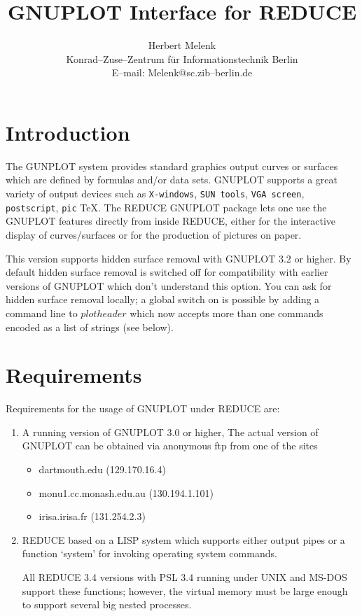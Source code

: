 \date{}
\title{GNUPLOT Interface for REDUCE}
\author{Herbert Melenk \\ 
Konrad--Zuse--Zentrum f\"ur Informationstechnik Berlin \\
E--mail: Melenk@sc.zib--berlin.de}

\maketitle

 
\section{Introduction}
The GUNPLOT system provides standard graphics output 
curves or surfaces which are defined by  
formulas and/or data sets. GNUPLOT supports a great variety of output devices
such as \verb+X-windows+, \verb+SUN tools+, 
\verb+VGA screen+, \verb+postscript+, \verb+pic+ \TeX.
The {\small REDUCE} GNUPLOT package lets one use the GNUPLOT
features directly from inside {\small REDUCE}, either for
the interactive display of curves/surfaces or for the production
of pictures on paper. 

This version supports hidden surface removal with GNUPLOT 3.2 or higher.
By default hidden surface removal is switched off for compatibility with
earlier versions of GNUPLOT which don't understand this option.
You can ask for hidden surface removal locally; a global switch on is
possible by adding a command line to $plotheader$ which now accepts
more than one commands encoded as a list of strings (see below).

 
\section{Requirements}
Requirements for the usage of GNUPLOT under REDUCE are:
\begin{enumerate}
\item A running version of GNUPLOT 3.0 or higher,
The actual version of GNUPLOT can be obtained via anonymous ftp
from one of the sites
\begin{itemize}
\item dartmouth.edu (129.170.16.4)
\item monu1.cc.monash.edu.au (130.194.1.101)
\item irisa.irisa.fr (131.254.2.3)
\end{itemize}

\item REDUCE based on a LISP system which supports either
      output pipes or a function `system' for invoking
      operating system commands.

All REDUCE 3.4 versions with PSL 3.4 running under UNIX and MS-DOS support
these functions; however, the virtual memory
must be large enough to support several big nested processes.
\end{enumerate}
 
